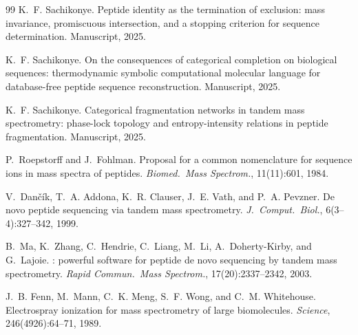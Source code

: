 \documentclass[11pt,a4paper]{article}
\theoremstyle{definition}
\theoremstyle{remark}
\begin{document}
\begin{thebibliography}{99}
K.~F. Sachikonye.
\newblock Peptide identity as the termination of exclusion: mass
  invariance, promiscuous intersection, and a stopping criterion for
  sequence determination.
\newblock Manuscript, 2025.

K.~F. Sachikonye.
\newblock On the consequences of categorical completion on biological
  sequences: thermodynamic symbolic computational molecular language for
  database-free peptide sequence reconstruction.
\newblock Manuscript, 2025.

K.~F. Sachikonye.
\newblock Categorical fragmentation networks in tandem mass spectrometry:
  phase-lock topology and entropy-intensity relations in peptide
  fragmentation.
\newblock Manuscript, 2025.

P.~Roepstorff and J.~Fohlman.
\newblock Proposal for a common nomenclature for sequence ions in mass
  spectra of peptides.
\newblock \emph{Biomed.\ Mass Spectrom.}, 11(11):601, 1984.

V.~Dan\v{c}\'ik, T.~A. Addona, K.~R. Clauser, J.~E. Vath, and
  P.~A. Pevzner.
\newblock De novo peptide sequencing via tandem mass spectrometry.
\newblock \emph{J.\ Comput.\ Biol.}, 6(3--4):327--342, 1999.

B.~Ma, K.~Zhang, C.~Hendrie, C.~Liang, M.~Li, A.~Doherty-Kirby,
  and G.~Lajoie.
: powerful software for peptide de novo sequencing by
  tandem mass spectrometry.
\newblock \emph{Rapid Commun.\ Mass Spectrom.}, 17(20):2337--2342, 2003.

J.~B. Fenn, M.~Mann, C.~K. Meng, S.~F. Wong, and C.~M. Whitehouse.
\newblock Electrospray ionization for mass spectrometry of large
  biomolecules.
\newblock \emph{Science}, 246(4926):64--71, 1989.

\end{thebibliography}
\endgroup
\end{document}
